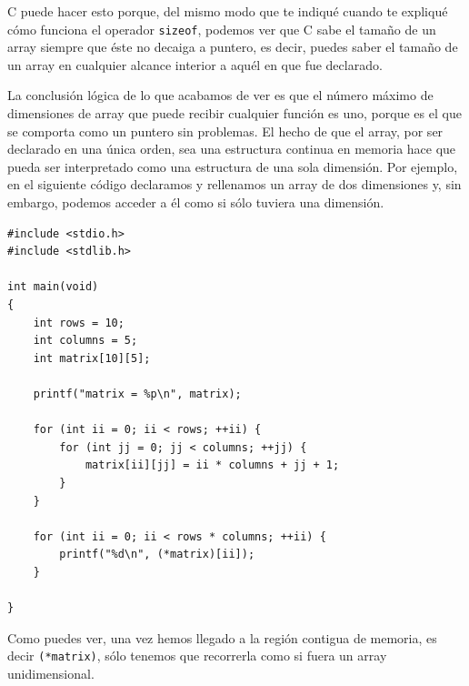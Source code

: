 \documentclass[a4paper]{article}
\begin{document}
C puede hacer esto porque, del mismo modo que te indiqué cuando te expliqué
cómo funciona el operador \verb!sizeof!, podemos ver que C sabe el tamaño de un
array siempre que éste no decaiga a puntero, es decir, puedes saber el tamaño
de un array en cualquier alcance interior a aquél en que fue declarado.

La conclusión lógica de lo que acabamos de ver es que el número máximo de
dimensiones de array que puede recibir cualquier función es uno, porque es el que
se comporta como un puntero sin problemas. El hecho de que el array, por ser
declarado en una única orden, sea una estructura continua en memoria hace que
pueda ser interpretado como una estructura de una sola dimensión. Por ejemplo,
en el siguiente código declaramos y rellenamos un array de dos dimensiones y,
sin embargo, podemos acceder a él como si sólo tuviera una dimensión.

\noindent
\begin{minipage}[H]{\linewidth}
\mbox{}
\begin{lstlisting}[style=C,
caption={Uso de un array como una estructura unidimensional},
label={lst:bidimensionalArrayAsOneDimension}]
#include <stdio.h>
#include <stdlib.h>

int main(void)
{
    int rows = 10;
    int columns = 5;
    int matrix[10][5];

    printf("matrix = %p\n", matrix);

    for (int ii = 0; ii < rows; ++ii) {
        for (int jj = 0; jj < columns; ++jj) {
            matrix[ii][jj] = ii * columns + jj + 1;
        }
    }

    for (int ii = 0; ii < rows * columns; ++ii) {
        printf("%d\n", (*matrix)[ii]);
    }

}
\end{lstlisting}
\end{minipage}

Como puedes ver, una vez hemos llegado a la región contigua de memoria, es decir
\verb!(*matrix)!, sólo tenemos que recorrerla como si fuera un array
unidimensional.
\end{document}
